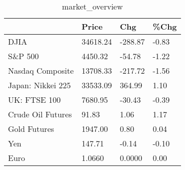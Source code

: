 \documentclass{article}%
\begin{document}
%


\begin{table}[htbp]%
\caption{market\_overview}%
\centering%
\begin{adjustbox}{width=1\textwidth}%
\begin{tabular}{llll}
\toprule
                  &    Price &     Chg &  \%Chg \\
\midrule
             DJIA & 34618.24 & -288.87 & -0.83 \\
          S\&P 500 &  4450.32 &  -54.78 & -1.22 \\
 Nasdaq Composite & 13708.33 & -217.72 & -1.56 \\
Japan: Nikkei 225 & 33533.09 &  364.99 &  1.10 \\
     UK: FTSE 100 &  7680.95 &  -30.43 & -0.39 \\
Crude Oil Futures &    91.83 &    1.06 &  1.17 \\
     Gold Futures &  1947.00 &    0.80 &  0.04 \\
              Yen &   147.71 &   -0.14 & -0.10 \\
             Euro &   1.0660 &  0.0000 &  0.00 \\
\bottomrule
\end{tabular}
%
\end{adjustbox}%
\end{table}

%
\end{document}
